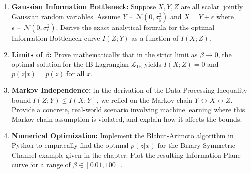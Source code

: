 \begin{enumerate}
    \item \textbf{Gaussian Information Bottleneck:} Suppose $X, Y, Z$ are all scalar, jointly Gaussian random variables. Assume $Y \sim \mathcal{N}(0, \sigma_y^2)$ and $X = Y + \epsilon$ where $\epsilon \sim \mathcal{N}(0, \sigma_e^2)$. Derive the exact analytical formula for the optimal Information Bottleneck curve $I(Z; Y)$ as a function of $I(X; Z)$.
    \item \textbf{Limits of $\beta$:} Prove mathematically that in the strict limit as $\beta \to 0$, the optimal solution for the IB Lagrangian $\mathcal{L}_{\text{IB}}$ yields $I(X; Z) = 0$ and $p(z|x) = p(z)$ for all $x$. 
    \item \textbf{Markov Independence:} In the derivation of the Data Processing Inequality bound $I(Z; Y) \le I(X; Y)$, we relied on the Markov chain $Y \leftrightarrow X \leftrightarrow Z$. Provide a concrete, real-world scenario involving machine learning where this Markov chain assumption is violated, and explain how it affects the bounds.
    \item \textbf{Numerical Optimization:} Implement the Blahut-Arimoto algorithm in Python to empirically find the optimal $p(z|x)$ for the Binary Symmetric Channel example given in the chapter. Plot the resulting Information Plane curve for a range of $\beta \in [0.01, 100]$.
\end{enumerate}

